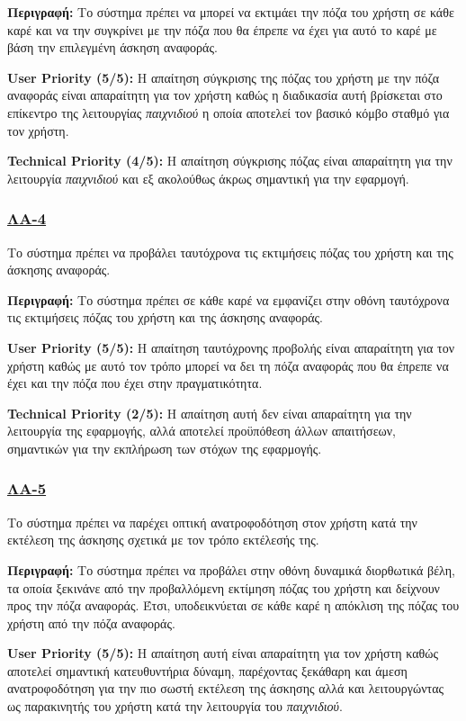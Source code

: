 \noindent\textbf{Περιγραφή:} Το σύστημα πρέπει να μπορεί να εκτιμάει την πόζα του χρήστη σε κάθε καρέ και να την συγκρίνει με την πόζα που θα έπρεπε να έχει για αυτό το καρέ με βάση την επιλεγμένη άσκηση αναφοράς.

\noindent\textbf{User Priority (5/5):} Η απαίτηση σύγκρισης της πόζας του χρήστη με την πόζα αναφοράς είναι απαραίτητη για τον χρήστη καθώς η διαδικασία αυτή βρίσκεται στο επίκεντρο της λειτουργίας \textsl{παιχνιδιού} η οποία αποτελεί τον βασικό κόμβο σταθμό για τον χρήστη.

\noindent\textbf{Technical Priority (4/5):} Η απαίτηση σύγκρισης πόζας είναι απαραίτητη για την λειτουργία \textsl{παιχνιδιού} και εξ ακολούθως άκρως σημαντική για την εφαρμογή.

\subsubsection{\underline{ΛΑ-4}}
\noindent Το σύστημα πρέπει να προβάλει ταυτόχρονα τις εκτιμήσεις πόζας του χρήστη και της άσκησης αναφοράς.

\noindent\textbf{Περιγραφή:} Το σύστημα πρέπει σε κάθε καρέ να εμφανίζει στην οθόνη ταυτόχρονα τις εκτιμήσεις πόζας του χρήστη και της άσκησης αναφοράς.

\noindent\textbf{User Priority (5/5):} Η απαίτηση ταυτόχρονης προβολής είναι απαραίτητη για τον χρήστη καθώς με αυτό τον τρόπο μπορεί να δει τη πόζα αναφοράς που θα έπρεπε να έχει και την πόζα που έχει στην πραγματικότητα.

\noindent\textbf{Technical Priority (2/5):} Η απαίτηση αυτή δεν είναι απαραίτητη για την λειτουργία της εφαρμογής, αλλά αποτελεί προϋπόθεση άλλων απαιτήσεων, σημαντικών για την εκπλήρωση των στόχων της εφαρμογής.

\subsubsection{\underline{ΛΑ-5}}
\noindent Το σύστημα πρέπει να παρέχει οπτική ανατροφοδότηση στον χρήστη κατά την εκτέλεση της άσκησης σχετικά με τον τρόπο εκτέλεσής της.

\noindent\textbf{Περιγραφή:} Το σύστημα πρέπει να προβάλει στην οθόνη δυναμικά διορθωτικά βέλη, τα οποία ξεκινάνε από την προβαλλόμενη εκτίμηση πόζας του χρήστη και δείχνουν προς την πόζα αναφοράς. Έτσι, υποδεικνύεται σε κάθε καρέ η απόκλιση της πόζας του χρήστη από την πόζα αναφοράς.

\noindent\textbf{User Priority (5/5):} Η απαίτηση αυτή είναι απαραίτητη για τον χρήστη καθώς αποτελεί σημαντική κατευθυντήρια δύναμη, παρέχοντας ξεκάθαρη και άμεση ανατροφοδότηση για την πιο σωστή εκτέλεση της άσκησης αλλά και λειτουργώντας ως παρακινητής του χρήστη κατά την λειτουργία του \textsl{παιχνιδιού}. 

